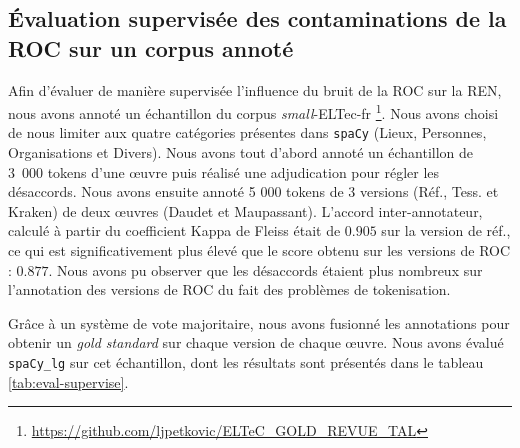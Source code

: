 

\subsection{\'Evaluation supervisée des contaminations de la ROC sur un corpus annoté}
\label{subsec:eval_supervis_OCR-IMPACT-NER}
Afin d'évaluer de manière supervisée l'influence du bruit de la ROC sur la REN, nous avons annoté un échantillon du corpus \textit{small}-ELTec-fr \footnote{\url{https://github.com/ljpetkovic/ELTeC_GOLD_REVUE_TAL}}.
 Nous avons choisi de nous limiter aux quatre catégories présentes dans \texttt{spaCy} (Lieux, Personnes, Organisations et Divers).
  Nous avons tout d'abord annoté un échantillon de 3~000 tokens d'une œuvre  puis réalisé une adjudication pour régler les désaccords. 
  Nous avons ensuite annoté 5 000 tokens de 3 versions (Réf., Tess. et Kraken) de deux œuvres (Daudet et Maupassant). %
L'accord inter-annotateur, calculé à partir du coefficient Kappa de Fleiss \cite{fleiss2013statistical} était de $0.905$ sur la version de réf., ce qui est significativement plus élevé que le score obtenu sur les versions de ROC : $0.877$.
 Nous avons pu observer que les désaccords étaient plus nombreux sur l'annotation des versions de ROC du fait des problèmes de tokenisation.

Grâce à un système de vote majoritaire, nous avons fusionné les annotations pour obtenir un \textit{gold standard} sur chaque version de chaque œuvre.
 Nous avons évalué \texttt{spaCy\_lg} sur cet échantillon, dont les résultats sont présentés dans le tableau \ref{tab:eval-supervise}. 
 
